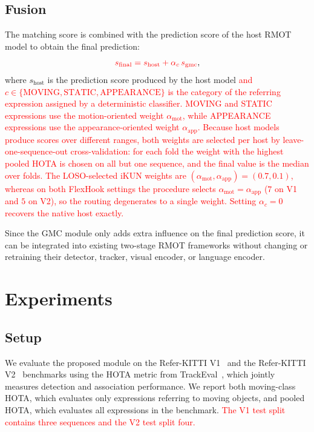 \documentclass{article}
\begin{document}
\subsection{Fusion}
\label{sec:fusion}
The matching score is combined with the prediction score of the host RMOT model to obtain the final prediction:
\begin{equation}
  \textcolor{red}{s_{\mathrm{final}} = s_{\mathrm{host}} + \alpha_{c}\,s_{\mathrm{gmc}}},
  \label{eq:fusion}
\end{equation}
where $s_{\mathrm{host}}$ is the prediction score produced by the host model \textcolor{red}{and $c\in\{\mathrm{MOVING},\mathrm{STATIC},\mathrm{APPEARANCE}\}$ is the category of the referring expression assigned by a deterministic classifier. MOVING and STATIC expressions use the motion-oriented weight $\alpha_{\mathrm{mot}}$, while APPEARANCE expressions use the appearance-oriented weight $\alpha_{\mathrm{app}}$. Because host models produce scores over different ranges, both weights are selected per host by leave-one-sequence-out cross-validation: for each fold the weight with the highest pooled HOTA is chosen on all but one sequence, and the final value is the median over folds. The LOSO-selected iKUN weights are $(\alpha_{\mathrm{mot}},\alpha_{\mathrm{app}})=(0.7,0.1)$, whereas on both FlexHook settings the procedure selects $\alpha_{\mathrm{mot}}=\alpha_{\mathrm{app}}$ ($7$ on V1 and $5$ on V2), so the routing degenerates to a single weight. Setting $\alpha_c=0$ recovers the native host exactly.}


Since the GMC module only adds extra influence on the final prediction score, it can be integrated into existing two-stage RMOT frameworks without changing or retraining their detector, tracker, visual encoder, or language encoder.

\section{Experiments}
\label{sec:exp}

\subsection{Setup}
\label{sec:setup}
We evaluate the proposed module on the Refer-KITTI V1~\cite{transrmot} and the Refer-KITTI V2~\cite{temprmot} benchmarks using the HOTA metric from TrackEval~\cite{hota}, which jointly measures detection and association performance. We report both moving-class HOTA, which evaluates only expressions referring to moving objects, and pooled HOTA, which evaluates all expressions in the benchmark. \textcolor{red}{The V1 test split contains three sequences and the V2 test split four.}
\end{document}
